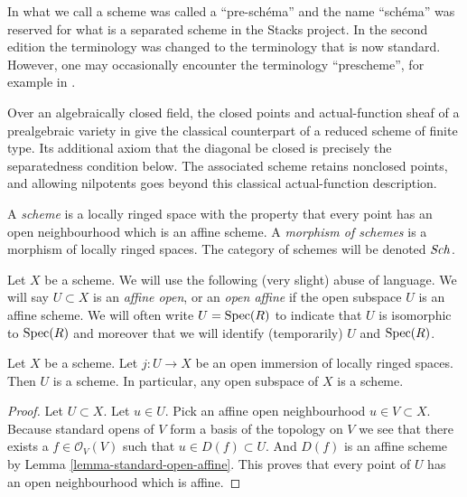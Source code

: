 \begin{definition}
\label{definition-scheme}
\begin{reference}
\cite[Chapter II, \S 1, no. 34, pp. 226--228]{FAC}
\end{reference}
\begin{history}
In \cite{EGA1} what we call a scheme was called a ``pre-sch\'ema'' and the
name ``sch\'ema'' was reserved for what is a separated scheme in the
Stacks project. In the second edition \cite{EGA1-second} the terminology
was changed to the terminology that is now standard. However, one may
occasionally encounter the terminology ``prescheme'', for example in
\cite{Murre-lectures}.

Over an algebraically closed field, the closed points and actual-function
sheaf of a prealgebraic variety in \cite{FAC} give the classical counterpart
of a reduced scheme of finite type. Its additional axiom that the diagonal
be closed is precisely the separatedness condition below. The associated
scheme retains nonclosed points, and allowing nilpotents goes beyond this
classical actual-function description.
\end{history}
A {\it scheme} is a locally ringed space with the property that
every point has an open neighbourhood which is an affine scheme.
A {\it morphism of schemes} is a morphism of locally
ringed spaces. The category of schemes will be denoted
$\mathit{Sch}$.
\end{definition}

\noindent
Let $X$ be a scheme.
We will use the following (very slight) abuse of language.
We will say $U \subset X$ is an {\it affine open}, or an {\it open affine}
if the open subspace $U$ is an affine scheme. We will often
write $U = \mathop{\mathrm{Spec}}(R)$ to indicate that $U$ is isomorphic
to $\mathop{\mathrm{Spec}}(R)$ and moreover that we will identify (temporarily)
$U$ and $\mathop{\mathrm{Spec}}(R)$.

\begin{lemma}
\label{lemma-open-subspace-scheme}
Let $X$ be a scheme. Let $j : U \to X$ be an open immersion
of locally ringed spaces. Then $U$ is a scheme. In particular,
any open subspace of $X$ is a scheme.
\end{lemma}

\begin{proof}
Let $U \subset X$. Let $u \in U$.
Pick an affine open neighbourhood $u \in V \subset X$.
Because standard opens of $V$ form a basis of the topology
on $V$ we see that there exists a $f\in \mathcal{O}_V(V)$
such that $u \in D(f) \subset U$. And $D(f)$ is an affine scheme
by Lemma \ref{lemma-standard-open-affine}. This proves that every point
of $U$ has an open neighbourhood which is affine.
\end{proof}

